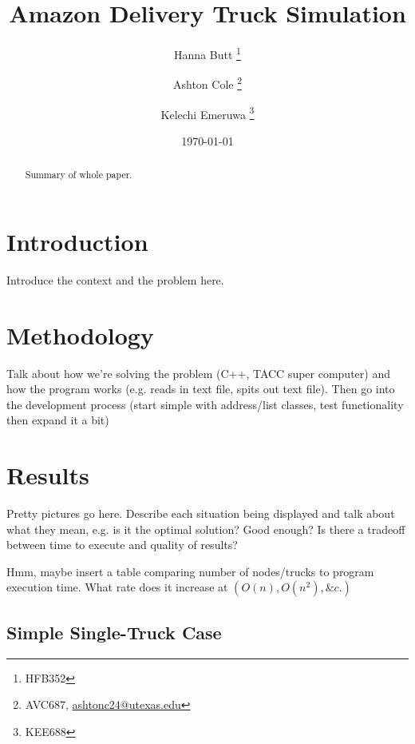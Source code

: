 \documentclass[letterpaper]{article}
\title{Amazon Delivery Truck Simulation}
\author{Hanna Butt \thanks{HFB352} \and Ashton Cole \thanks{AVC687, \href{mailto:ashtonc24@utexas.edu}{ashtonc24@utexas.edu}} \and Kelechi Emeruwa \thanks{KEE688}}
\date{\today}
\begin{document}
    \maketitle

    \begin{abstract}
        Summary of whole paper.
    \end{abstract}

    \section{Introduction}
    Introduce the context and the problem here.

    \section{Methodology}
    Talk about how we're solving the problem (C++, TACC super computer) and how the program works (e.g. reads in text file, spits out text file). Then go into the development process (start simple with address/list classes, test functionality then expand it a bit)

    \section{Results}
    Pretty pictures go here. Describe each situation being displayed and talk about what they mean, e.g. is it the optimal solution? Good enough? Is there a tradeoff between time to execute and quality of results?

    Hmm, maybe insert a table comparing number of nodes/trucks to program execution time. What rate does it increase at $(O(n), O(n^2), \&c.)$

    \subsection{Simple Single-Truck Case}
\end{document}
